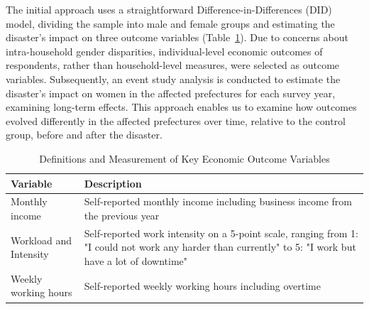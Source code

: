 \documentclass[a4paper,12pt]{article}
\begin{document}
\begin{table}[h]
\centering
\caption{Longitudinal Sample Size by Treatment Status and Survey Year, 2009-2018}
\label{tab:distribution}

\label{table:Longitudinal_sample}

\end{table}



The initial approach uses a straightforward Difference-in-Differences (DID) model, dividing the sample into male and female groups and estimating the disaster's impact on three outcome variables (Table~\ref{table:key_outcome_variables}). Due to concerns about intra-household gender disparities, individual-level economic outcomes of respondents, rather than household-level measures, were selected as outcome variables. Subsequently, an event study analysis is conducted to estimate the disaster's impact on women in the affected prefectures for each survey year, examining long-term effects. This approach enables us to examine how outcomes evolved differently in the affected prefectures over time, relative to the control group, before and after the disaster.

\begin{table}[htbp]
\centering
\caption{Definitions and Measurement of Key Economic Outcome Variables}
\label{tab:outcome_variables}
\begin{tabular}{p{5cm}p{10cm}}
\toprule
Variable & Description \\
\midrule
Monthly income & Self-reported monthly income including business income from the previous year \\
\midrule
Workload and Intensity & Self-reported work intensity on a 5-point scale, ranging from 1: "I could not work any harder than currently" to 5: "I work but have a lot of downtime"\\
\midrule
Weekly working hours & Self-reported weekly working hours including overtime \\
\bottomrule
\end{tabular}
\label{table:key_outcome_variables}
\end{table}
\end{document}
